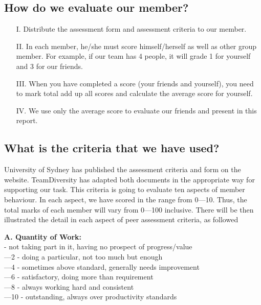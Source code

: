 \documentclass[11pt]{article}
\begin{document}
\subsection{How do we evaluate our member?}	
\begin{itemize}
\item[I.] Distribute the assessment form and assessment criteria to our member.
\item[II.] In each member, he/she must score himself/herself as well as other group member. For example, if our team has 4 people, it will grade 1 for yourself and 3 for our friends.
\item[III.] When you have completed a score (your friends and yourself), you need to mark total add up all scores and calculate the average score for yourself.
\item[IV.] We use only the average score to evaluate our friends and present in this report. 
\end{itemize}

\subsection{What is the criteria that we have used?}
University of Sydney \cite{AssessmentCiteria} has published the assessment criteria and form on the website. TeamDiversity has adapted both documents in the appropriate way for supporting our task. This criteria is going to evaluate ten aspects of member behaviour. In each aspect, we have scored in the range from 0—10. Thus, the total marks of each member will vary from 0—100 inclusive. There will be then illustrated the detail in each aspect of peer assessment criteria, as followed \newline

\textbf{A. Quantity of Work:}\\
	\indent{}	- not taking part in it, having no prospect of progress/value \\
	\indent{}—2	- doing a particular, not too much but enough\\
	\indent{}—4	- sometimes above standard, generally needs improvement \\
	\indent{}—6	- satisfactory, doing more than requirement \\
	\indent{}—8	- always working hard and consistent \\
	\indent{}—10	- outstanding, always over productivity standards \\
\end{document}

